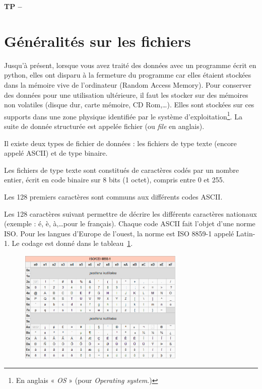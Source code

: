 

%



\begin{center}
{\Large\bf TP \no {\num} -- \descrip}
\end{center}

\section*{Généralités sur les fichiers}

Jusqu’à présent, lorsque vous avez traité des données avec un programme écrit en python, elles ont disparu à la fermeture du programme car elles étaient stockées dans la mémoire vive de l’ordinateur (Random Access Memory). Pour conserver des données pour une utilisation ultérieure, il faut les stocker sur des mémoires non volatiles (disque dur, carte mémoire, CD Rom,\dots). Elles sont stockées sur ces supports dans une zone physique identifiée par le système d’exploitation\footnote{En anglais « \textit{OS} » (pour \textit{Operating system}.)}. La suite de donnée structurée est appelée fichier (ou \textit{file} en anglais).

Il existe deux types de fichier de données : les fichiers de type texte (encore appelé ASCII) et de type binaire.

Les fichiers de type texte sont constitués de caractères codés par un nombre entier, écrit en code binaire sur 8 bits (1 octet), compris entre 0 et 255.

Les 128 premiers caractères sont communs aux différents codes ASCII. 

Les 128 caractères suivant permettre de décrire les différents caractères nationaux (exemple : é, è, à,\dots pour le français). Chaque code ASCII fait l’objet d’une norme ISO. Pour les langues d’Europe de l’ouest, la norme est ISO 8859-1 appelé Latin-1. Le codage est donné dans le tableau~\ref{fig:tableASCII}.

\begin{figure}[htp]
 \centering
 \includegraphics[width=8cm]{tableASCII}
 \label{fig:tableASCII}
\end{figure}

